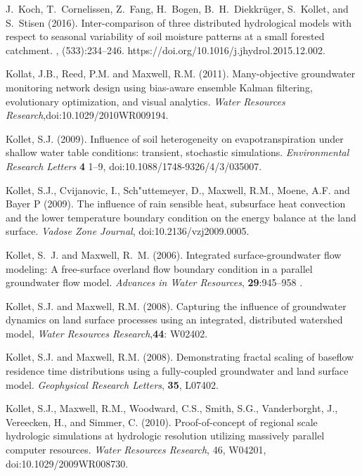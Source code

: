 \begin{thebibliography}{999}
J.~Koch, T.~Cornelissen, Z.~Fang, H.~Bogen, B.~H.~Diekkr{\"u}ger, S.~Kollet,
and S.~Stisen (2016).
\newblock Inter-comparison of three distributed hydrological models with
  respect to seasonal variability of soil moisture patterns at a small forested
  catchment.
, (533):234--246. https://doi.org/10.1016/j.jhydrol.2015.12.002.


Kollat, J.B., Reed, P.M. and Maxwell, R.M. (2011). Many-objective groundwater monitoring network design using bias-aware ensemble Kalman filtering, evolutionary optimization, and visual analytics. {\em Water Resources Research},doi:10.1029/2010WR009194.

Kollet, S.J. (2009). Influence of soil heterogeneity on evapotranspiration under shallow water table conditions: transient, stochastic simulations. {\em Environmental Research Letters} {\bf 4} 1--9, doi:10.1088/1748-9326/4/3/035007.

Kollet, S.J., Cvijanovic, I., Sch{\a"u}ttemeyer, D., Maxwell, R.M., Moene, A.F. and Bayer P (2009). The influence of rain sensible heat, subsurface heat convection and the lower temperature boundary condition on the energy balance at the land surface. {\em Vadose Zone Journal}, doi:10.2136/vzj2009.0005.

Kollet, S.~J. and Maxwell, R.~M. (2006). Integrated
surface-groundwater flow
  modeling: A free-surface overland flow boundary condition in a parallel
  groundwater flow model. {\em Advances in Water Resources}, {\bf 29}:945--958 .

Kollet, S.J. and Maxwell, R.M. (2008). Capturing the influence of groundwater dynamics on land surface processes using an integrated, distributed watershed model, { \em Water Resources Research},{\bf 44}: W02402.

Kollet, S.J. and Maxwell, R.M. (2008). Demonstrating fractal scaling of baseflow residence time distributions using a fully-coupled groundwater and land surface model. {\em Geophysical Research Letters}, {\bf 35}, L07402.

Kollet, S.J., Maxwell, R.M., Woodward, C.S., Smith, S.G., Vanderborght, J., Vereecken, H., and Simmer, C. (2010). Proof-of-concept of regional scale hydrologic simulations at hydrologic resolution utilizing massively parallel computer resources. {\em Water Resources Research}, 46, W04201, doi:10.1029/2009WR008730.


\end{thebibliography}
